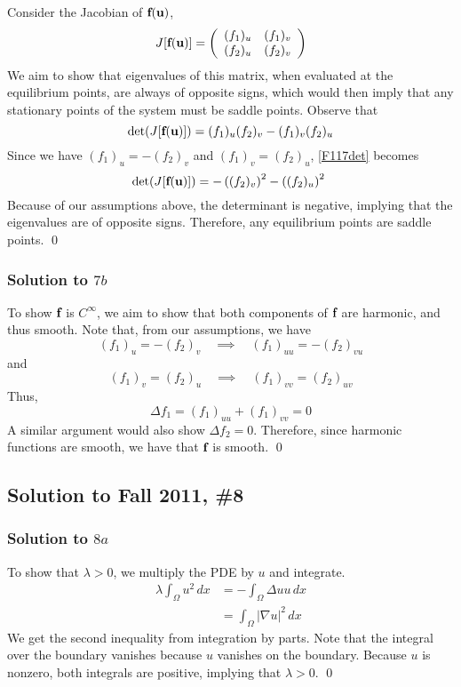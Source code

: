 Consider the Jacobian of $\textbf{f}(\textbf{u})$,
$$ J[\textbf{f}(\textbf{u})] = \left(
\begin{array}{cc}
(f_1)_u & (f_1)_v \\
(f_2)_u & (f_2)_v
\end{array}
\right)
$$
We aim to show that eigenvalues of this matrix, when evaluated at the equilibrium points, are always of opposite signs, which would then imply that any stationary points of the system must be saddle points. Observe that
\begin{equation}
\label{F117det}
\det(J[\textbf{f}(\textbf{u})]) = (f_1)_u (f_2)_v - (f_1)_v (f_2)_u
\end{equation}
Since we have $(f_1)_u = -(f_2)_v$ and $(f_1)_v = (f_2)_u$, \eqref{F117det} becomes
$$ \det(J[\textbf{f}(\textbf{u})]) = -\left((f_2)_v \right)^2 - \left((f_2)_u \right)^2 \ $$
Because of our assumptions above, the determinant is negative, implying that the eigenvalues are of opposite signs. Therefore, any equilibrium points are saddle points. \hfill \qed


\subsubsection*{Solution to $7b$}
To show $\textbf{f}$ is $C^{\infty}$, we aim to show that both components of $\textbf{f}$ are harmonic, and thus smooth. Note that, from our assumptions, we have
$$ (f_1)_u = -(f_2)_v \quad \implies \quad (f_1)_{uu} = -(f_2)_{vu} $$
and
$$ (f_1)_v = (f_2)_u \quad \implies \quad (f_1)_{vv} = (f_2)_{uv} $$
Thus,
$$ \Delta f_1 = (f_1)_{uu} + (f_1)_{vv} = 0 $$
A similar argument would also show $\Delta f_2 = 0$. Therefore, since harmonic functions are smooth, we have that $\textbf{f}$ is smooth. \hfill \qed





\subsection*{Solution to Fall 2011, \#8}
\label{F118}

\subsubsection*{Solution to $8a$}

To show that $\lambda > 0$, we multiply the PDE by $u$ and integrate.
\begin{align*}
\lambda \int_{\Omega} u^2 \, dx &= -\int_{\Omega} \Delta u u \, dx \\	
&= \int_{\Omega} |\nabla u|^2 \, dx
\end{align*}
We get the second inequality from integration by parts. Note that the integral over the boundary vanishes because $u$ vanishes on the boundary. Because $u$ is nonzero, both integrals are positive, implying that $\lambda > 0$. \hfill \qed


